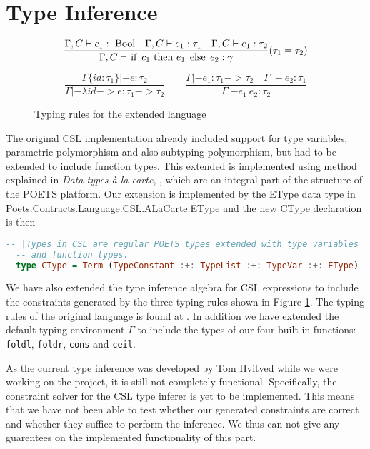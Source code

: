 \documentclass[10pt,a4paper,final,oneside,openany,article]{memoir}
\newcommand{\kw}[1]{\text{\lstinline{#1}}}
\begin{document}
\section{Type Inference}
\begin{figure}
  \begin{equation*}
    \frac{
      \Gamma, C |- c_1 : ~\kw{Bool}
      \quad \Gamma, C |- e_1 : \tau_1
      \quad \Gamma, C |- e_1 : \tau_2
    }{
      \Gamma, C |- \kw{if}~ c_1 ~\kw{then}~ e_1 ~\kw{else}~ e_2 : \gamma
    }(\tau_1=\tau_2)\label{eq:type_cond}
  \end{equation*}

\begin{equation*}
  \frac{
    \Gamma\{id : \tau_1\} |- e : \tau_2
  }{
    \Gamma |- \lambda id -> e : \tau_1 -> \tau_2
  }
  \quad \quad 
  \frac{
    \Gamma |- e_1 : \tau_1 -> \tau_2
    \quad \Gamma |- e_2 : \tau_1
  }{
    \Gamma |- e_1~ e_2 : \tau_2
  }\label{eq:type_apply}
\end{equation*}

\caption{Typing rules for the extended language}
\label{fig:typing_rules}
\end{figure}
The original CSL implementation already included support for type
variables, parametric polymorphism and also subtyping polymorphism,
but had to be extended to include function types.  This extended is
implemented using method explained in \textit{Data types à la carte},
\cite{swierstra2008data}, which are an integral part of the structure
of the POETS platform. Our extension is implemented by the EType
data type in Poets.Contracts.Language.CSL.ALaCarte.EType and the new
CType declaration is then
\begin{lstlisting}[language=Haskell]
  -- |Types in CSL are regular POETS types extended with type variables
  -- and function types.
  type CType = Term (TypeConstant :+: TypeList :+: TypeVar :+: EType)
\end{lstlisting}

We have also extended the type inference algebra for CSL expressions
to include the constraints generated by the three typing rules shown
in Figure \ref{fig:typing_rules}. The typing rules of the original
language is found at \cite[page 17, Figure
3]{hvitved10}. 
In addition we have extended the default typing environment $\Gamma$
to include the types of our four built-in functions:
\lstinline{foldl}, \lstinline{foldr}, \lstinline{cons} and
\lstinline{ceil}.

As the current type inference was developed by Tom Hvitved while we
were working on the project, it is still not completely
functional. Specifically, the constraint solver for the CSL type
inferer is yet to be implemented. This means that we have not been
able to test whether our generated constraints are correct and whether
they suffice to perform the inference. We thus can not give any
guarentees on the implemented functionality of this part.
\end{document}
